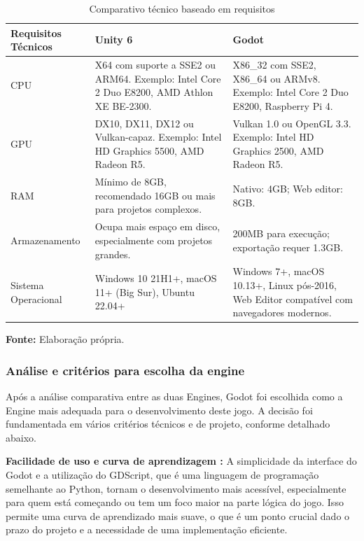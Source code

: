 \begin{table}[H]
\centering
\caption{Comparativo técnico baseado em requisitos}
\label{tab:comparativo-tecnico-engines}
\begin{tabularx}{\textwidth}{|>{\raggedright\arraybackslash}X|>{\raggedright\arraybackslash}X|>{\raggedright\arraybackslash}X|}
\hline
\textbf{Requisitos Técnicos} & \textbf{Unity 6} & \textbf{Godot} \\
\hline
CPU & 
X64 com suporte a SSE2 ou ARM64. Exemplo: Intel Core 2 Duo E8200, AMD Athlon XE BE-2300. & 
X86\_32 com SSE2, X86\_64 ou ARMv8. Exemplo: Intel Core 2 Duo E8200, Raspberry Pi 4. \\
\hline
GPU & 
DX10, DX11, DX12 ou Vulkan-capaz. Exemplo: Intel HD Graphics 5500, AMD Radeon R5. & 
Vulkan 1.0 ou OpenGL 3.3. Exemplo: Intel HD Graphics 2500, AMD Radeon R5. \\
\hline
RAM & 
Mínimo de 8GB, recomendado 16GB ou mais para projetos complexos. & 
Nativo: 4GB; Web editor: 8GB. \\
\hline
Armazenamento & 
Ocupa mais espaço em disco, especialmente com projetos grandes. & 
200MB para execução; exportação requer 1.3GB. \\
\hline
Sistema Operacional & 
Windows 10 21H1+, macOS 11+ (Big Sur), Ubuntu 22.04+ & 
Windows 7+, macOS 10.13+, Linux pós-2016, Web Editor compatível com navegadores modernos. \\
\hline
\end{tabularx}

\smallskip
\raggedleft \textbf{Fonte:} Elaboração própria.
\end{table}

\subsubsection{Análise e critérios para escolha da engine}

Após a análise comparativa entre as duas Engines, Godot foi escolhida como a Engine mais adequada para o desenvolvimento deste jogo. A decisão foi fundamentada em vários critérios técnicos e de projeto, conforme detalhado abaixo.

\textbf{Facilidade de uso e curva de aprendizagem :}
A simplicidade da interface do Godot e a utilização do GDScript, que é uma linguagem de programação semelhante ao Python, tornam o desenvolvimento mais acessível, especialmente para quem está começando ou tem um foco maior na parte lógica do jogo. Isso permite uma curva de aprendizado mais suave, o que é um ponto crucial dado o prazo do projeto e a necessidade de uma implementação eficiente.

